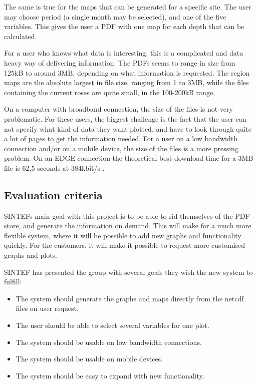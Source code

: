 \documentclass[11pt,a4paper,titlepage,oneside]{report}
\begin{document}
The same is true for the maps that can be generated for a specific site. The user may choose period (a single month may be selected), and one of the five variables. This gives the user a PDF with one map for each depth that can be calculated. 

For a user who knows what data is interesting, this is a complicated and data heavy way of delivering information. The PDFs seems to range in size from 125kB to around 3MB, depending on what information is requested. The region maps are the absolute largest in file size, ranging from 1 to 3MB, while the files containing the current roses are quite small, in the 100-200kB range. 

On a computer with broadband connection, the size of the files is not very problematic. For these users, the biggest challenge is the fact that the user can not specify what kind of data they want plotted, and have to look through quite a lot of pages to get the information needed. For a user on a low bandwidth connection and/or on a mobile device, the size of the files is a more pressing problem. On an \gls{EDGE} connection the theoretical best download time for a 3MB file is 62,5 seconds at 384kbit/s \cite{3gpp.com}.

\subsection{Evaluation criteria}
SINTEFs main goal with this project is to be able to rid themselves of the PDF store, and generate the information on demand. This will make for a much more flexible system, where it will be possible to add new graphs and functionality quickly. For the customers, it will make it possible to request more customised graphs and plots.

SINTEF has presented the group with several goals they wish the new system to fulfill:

\begin{itemize}
\item The system should generate the graphs and maps directly from the \gls{netcdf} files on user request.
\item The user should be able to select several variables for one plot.
\item The system should be usable on low bandwidth connections.
\item The system should be usable on mobile devices.
\item The system should be easy to expand with new functionality.
\end{itemize} 
\end{document}
